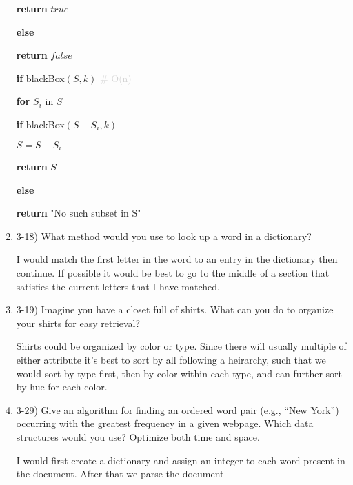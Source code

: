 \documentclass{article}
\begin{document}
\begin{enumerate}
{\begin{minipage}{0.8\textwidth}
    \quad \quad \textbf{return} $true$
    
    \quad \textbf{else}
        
    \quad \quad \textbf{return} $false$

    \textbf{if} blackBox$(S, k)$ \textcolor{lightgray}{ \# O(n)}
    
    \quad \textbf{for} $S_i$ in $S$

    \quad \quad \textbf{if} blackBox$(S - S_i, k)$

    \quad \quad \quad $S = S - S_i$

    \quad \textbf{return} $S$

    \textbf{else}

    \quad \textbf{return} "No such subset in S"

    \end{minipage}
    }

    \item 3-18) What method would you use to look up a word in a dictionary?
    
    I would match the first letter in the word to an entry in the dictionary then continue. If possible it would be best to go to the middle of a section that satisfies the current letters that I have matched.
    
    \item 3-19) Imagine you have a closet full of shirts. What can you do to organize your shirts for easy retrieval?
    
    Shirts could be organized by color or type. Since there will usually multiple of either attribute it's best to sort by all following a heirarchy, such that we would sort by type first, then by color within each type, and can further sort by hue for each color.
    
    \item 3-29) Give an algorithm for finding an ordered word pair (e.g., “New York”) occurring with the greatest frequency in a given webpage. Which data structures would you use? Optimize both time and space. 

    I would first create a dictionary and assign an integer to each word present in the document. After that we parse the document



\end{enumerate}
\end{document}

